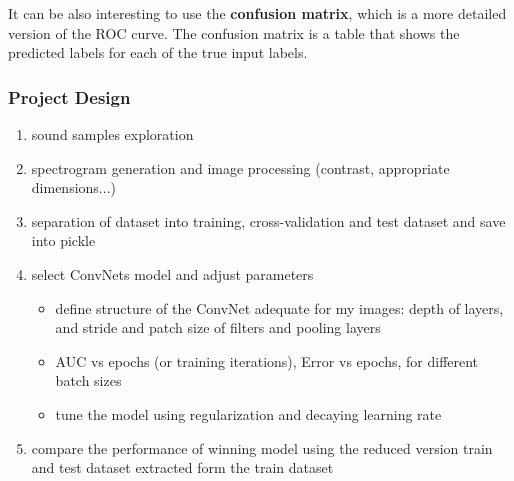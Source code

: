 \documentclass[]{article}
\begin{document}
It can be also interesting to use the \textbf{confusion matrix}, which is a more detailed version of the ROC curve. The confusion matrix is a table that shows the predicted labels for each of the true input labels.



\subsubsection{Project Design}\label{project-design}

\begin{enumerate}
	\item sound samples exploration
	\item spectrogram generation and image processing (contrast, appropriate dimensions...)
	\item separation of dataset into training, cross-validation and test dataset and save into pickle 
	\item select ConvNets model and adjust parameters
	\begin{itemize}
		\item define structure of the ConvNet adequate for my images: depth of layers, and stride and patch size of filters and pooling layers
		\item AUC vs epochs (or training iterations), Error vs epochs, for different batch sizes
		\item tune the model using regularization and decaying learning rate		
	\end{itemize}
	\item compare the performance of winning model using the reduced version train and test dataset extracted form the train dataset
\end{enumerate}
\end{document}
